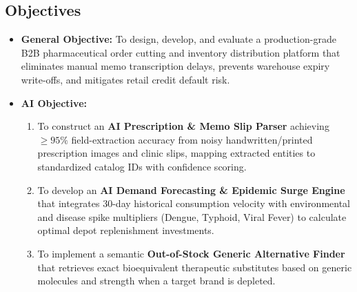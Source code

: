 \documentclass[12pt,a4paper]{article}
\begin{document}
\subsection{Objectives}
\begin{itemize}
    \item \textbf{General Objective:} To design, develop, and evaluate a production-grade B2B pharmaceutical order cutting and inventory distribution platform that eliminates manual memo transcription delays, prevents warehouse expiry write-offs, and mitigates retail credit default risk.
    \item \textbf{AI Objective:} 
    \begin{enumerate}[label=(\alph*)]
        \item To construct an \textbf{AI Prescription \& Memo Slip Parser} achieving $\ge 95\%$ field-extraction accuracy from noisy handwritten/printed prescription images and clinic slips, mapping extracted entities to standardized catalog IDs with confidence scoring.
        \item To develop an \textbf{AI Demand Forecasting \& Epidemic Surge Engine} that integrates 30-day historical consumption velocity with environmental and disease spike multipliers (Dengue, Typhoid, Viral Fever) to calculate optimal depot replenishment investments.
        \item To implement a semantic \textbf{Out-of-Stock Generic Alternative Finder} that retrieves exact bioequivalent therapeutic substitutes based on generic molecules and strength when a target brand is depleted.
    \end{enumerate}
\end{itemize}
\end{document}
